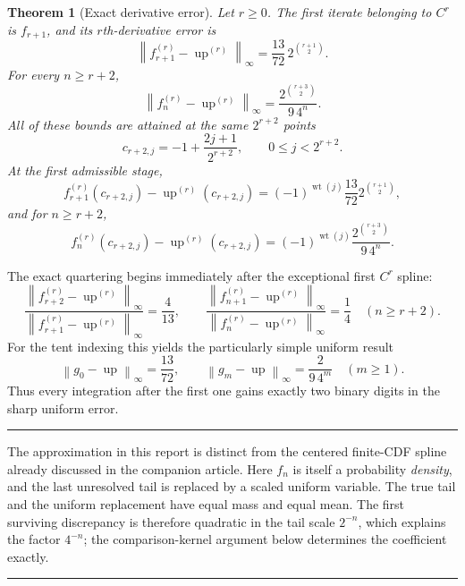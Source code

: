\documentclass[11pt,oneside]{article}
\newtheorem{theorem}{Theorem}[section]
\theoremstyle{definition}
\theoremstyle{remark}
\newcommand{\Up}{\operatorname{up}}
\newcommand{\wt}{\operatorname{wt}}
\newcommand{\norm}[1]{\left\lVert#1\right\rVert}
\newenvironment{boxedremark}{%
  \par\smallskip\noindent\begin{center}\begin{minipage}{0.94\textwidth}%
  \color{black}\hrule\vspace{0.6em}\small
}{%
  \vspace{0.6em}\hrule\end{minipage}\end{center}\smallskip
}
\begin{document}
\begin{theorem}[Exact derivative error]
\label{thm:main-exact-rate-intro}
Let $r\ge0$.
The first iterate belonging to $C^r$ is $f_{r+1}$, and its $r$th-derivative error is
\begin{equation}
 \norm{f_{r+1}^{(r)}-\Up^{(r)}}_\infty
 =\frac{13}{72}\,2^{\binom{r+1}{2}}.
 \label{eq:first-admissible-error}
\end{equation}
For every $n\ge r+2$,
\begin{equation}
 \boxed{\displaystyle
 \norm{f_n^{(r)}-\Up^{(r)}}_\infty
 =\frac{2^{\binom{r+3}{2}}}{9\,4^n}.}
 \label{eq:main-exact-rate}
\end{equation}
All of these bounds are attained at the same $2^{r+2}$ points
\begin{equation}
 c_{r+2,j}=-1+\frac{2j+1}{2^{r+2}},
 \qquad 0\le j<2^{r+2}.
 \label{eq:error-extremizer-grid}
\end{equation}
At the first admissible stage,
\begin{equation}
 f_{r+1}^{(r)}(c_{r+2,j})-\Up^{(r)}(c_{r+2,j})
 =(-1)^{\wt(j)}\frac{13}{72}2^{\binom{r+1}{2}},
 \label{eq:signed-first-stage-error}
\end{equation}
and for $n\ge r+2$,
\begin{equation}
 f_n^{(r)}(c_{r+2,j})-\Up^{(r)}(c_{r+2,j})
 =(-1)^{\wt(j)}\frac{2^{\binom{r+3}{2}}}{9\,4^n}.
 \label{eq:signed-extremizer-error}
\end{equation}
\end{theorem}

The exact quartering begins immediately after the exceptional first $C^r$ spline:
\begin{equation}
 \frac{\norm{f_{r+2}^{(r)}-\Up^{(r)}}_\infty}
 {\norm{f_{r+1}^{(r)}-\Up^{(r)}}_\infty}=\frac4{13},
 \qquad
 \frac{\norm{f_{n+1}^{(r)}-\Up^{(r)}}_\infty}
 {\norm{f_n^{(r)}-\Up^{(r)}}_\infty}=\frac14
 \quad(n\ge r+2).
 \label{eq:exact-error-ratios}
\end{equation}
For the tent indexing this yields the particularly simple uniform result
\begin{equation}
 \norm{g_0-\Up}_\infty=\frac{13}{72},
 \qquad
 \boxed{\displaystyle
 \norm{g_m-\Up}_\infty=\frac{2}{9\,4^m}\quad(m\ge1).}
 \label{eq:tent-uniform-rate}
\end{equation}
Thus every integration after the first one gains exactly two binary digits in the sharp
uniform error.

\begin{boxedremark}
The approximation in this report is distinct from the centered finite-CDF spline already
discussed in the companion article.  Here $f_n$ is itself a probability \emph{density}, and
the last unresolved tail is replaced by a scaled uniform variable.  The true tail and the
uniform replacement have equal mass and equal mean.  The first surviving discrepancy is
therefore quadratic in the tail scale $2^{-n}$, which explains the factor $4^{-n}$; the
comparison-kernel argument below determines the coefficient exactly.
\end{boxedremark}
\end{document}
